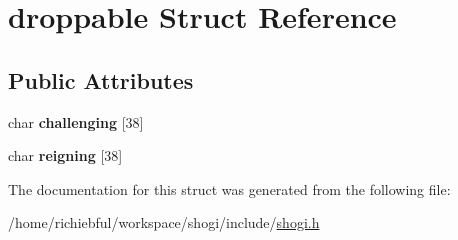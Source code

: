 \hypertarget{structdroppable}{\section{droppable Struct Reference}
\label{structdroppable}
}
\subsection*{Public Attributes}
\begin{DoxyCompactItemize}
\item 
\hypertarget{structdroppable_afae3c88dabe19f837a3f63a9eb776a3e}{char {\bfseries challenging} \mbox{[}38\mbox{]}}\label{structdroppable_afae3c88dabe19f837a3f63a9eb776a3e}

\item 
\hypertarget{structdroppable_a58f8107f35d44f06dd12e5ff45178222}{char {\bfseries reigning} \mbox{[}38\mbox{]}}\label{structdroppable_a58f8107f35d44f06dd12e5ff45178222}

\end{DoxyCompactItemize}


The documentation for this struct was generated from the following file\-:\begin{DoxyCompactItemize}
\item 
/home/richiebful/workspace/shogi/include/\hyperlink{shogi_8h}{shogi.\-h}\end{DoxyCompactItemize}
